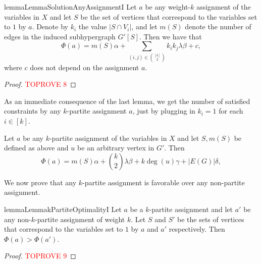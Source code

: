 \documentclass[a4paper,UKenglish,cleveref, autoref, thm-restate,numberwithinsect]{lipics-v2021}
\begin{document}
\begin{restatable}{lemma}{LemmaSolutionAnyAssignmentI}\label{lemma:solution-any-assignment}
    Let $a$ be any weight-$k$ assignment of the variables in $X$ and let $S$ be the set of vertices that correspond to the variables set to $1$ by $a$.
    Denote by $k_i$ the value $|S\cap V_i|$, and let $m(S)$ denote the number of edges in the induced subhypergraph $G'[S]$.
    Then we have that 
    \[
    \Phi(a) = m(S)\alpha + \sum_{(i,j)\in \binom{[k]}{2}} k_ik_j \lambda \beta + c,
    \]
    where $c$ does not depend on the assignment $a$.
\end{restatable}
\begin{proof}\textcolor{red}{TOPROVE 8}\end{proof}

As an immediate consequence of the last lemma, we get the number of satisfied constraints by any $k$-partite assignment $a$, just by plugging in $k_i=1$ for each $i\in [k]$.
\begin{corollary}\label{cor:solution-k-partite-assignment}
    Let $a$ be any $k$-partite assignment of the variables in $X$ and let $S, m(S)$ be defined as above and $u$ be an arbitrary vertex in $G'$.
    Then
    \[
    \Phi(a) = m(S)\alpha + \binom{k}{2} \lambda \beta + k \deg(u) \gamma + |E(G)| \delta,
    \]
\end{corollary}
We now prove that any $k$-partite assignment is favorable over any non-partite assignment.
\begin{restatable}{lemma}{LemmakPartiteOptimalityI}\label{lemma:optimality-of-k-partite-assignment}
    Let $a$ be a $k$-partite assignment and let $a'$ be any non-$k$-partite assignment of weight $k$.
    Let $S$ and $S'$ be the sets of vertices that correspond to the variables set to $1$ by $a$ and $a'$ respectively.
    Then $\Phi(a)>\Phi(a')$.
\end{restatable}
\begin{proof}\textcolor{red}{TOPROVE 9}\end{proof}
\end{document}

